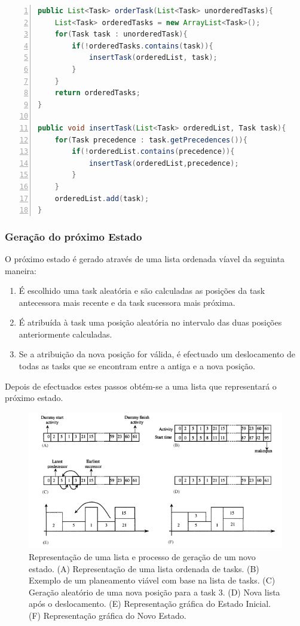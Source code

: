 \begin{titlepage}
\begin{lstlisting}[frame=single, language=java,numbers=left,numberfirstline=true]  
public List<Task> orderTask(List<Task> unorderedTasks){
	List<Task> orderedTasks = new ArrayList<Task>();
	for(Task task : unorderedTask){
		if(!orderedTasks.contains(task)){
			insertTask(orderedList, task);
		}
	}
	return orderedTasks;
}

public void insertTask(List<Task> orderedList, Task task){
	for(Task precedence : task.getPrecedences()){
		if(!orderedList.contains(precedence)){
			insertTask(orderedList,precedence);
		}
	}
	orderedList.add(task);	
}
\end{lstlisting}



\subsubsection{Geração do próximo Estado}

O próximo estado é gerado através de uma lista ordenada víavel da seguinta maneira:
\begin{enumerate}
\item É escolhido uma task aleatória e são calculadas as posições da task antecessora mais recente e da task sucessora mais próxima.
\item É atribuída à task uma posição aleatória no intervalo das duas posições anteriormente calculadas.
\item Se a atribuição da nova posição for válida, é efectuado um deslocamento de todas as tasks que se encontram entre a antiga e a nova posição.
\end{enumerate}

Depois de efectuados estes passos obtém-se a uma lista que representará o próximo estado. 

\begin{figure}[ht!]
  \includegraphics[scale=0.8]{sa.png}
  \caption{Representação de uma lista e processo de geração de um novo estado. (A) Representação de uma lista ordenada de tasks. (B) Exemplo de um planeamento viável com base na lista de tasks. (C) Geração aleatório de uma nova posição para a task 3. (D) Nova lista após o deslocamento. (E) Representação gráfica do Estado Inicial. (F) Representação gráfica do Novo Estado.}
  \label{Simulated Annealing}
\end{figure}


\end{titlepage}

